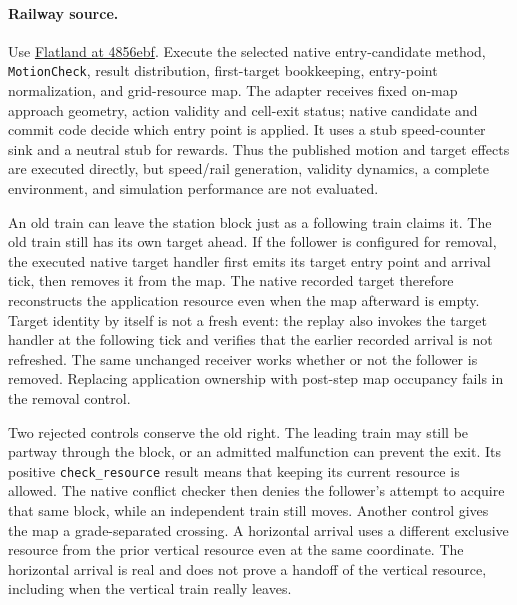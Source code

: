 \documentclass[11pt]{article}
\begin{document}
\paragraph{Railway source.}
Use \href{https://github.com/flatland-association/flatland-rl/tree/4856ebfe268d092d787d6b8536791a4fddb30772}{Flatland at 4856ebf}. Execute the selected native entry-candidate method, \texttt{MotionCheck}, result distribution, first-target bookkeeping, entry-point normalization, and grid-resource map. The adapter receives fixed on-map approach geometry, action validity and cell-exit status; native candidate and commit code decide which entry point is applied. It uses a stub speed-counter sink and a neutral stub for rewards. Thus the published motion and target effects are executed directly, but speed/rail generation, validity dynamics, a complete environment, and simulation performance are not evaluated.

An old train can leave the station block just as a following train claims it. The old train still has its own target ahead. If the follower is configured for removal, the executed native target handler first emits its target entry point and arrival tick, then removes it from the map. The native recorded target therefore reconstructs the application resource even when the map afterward is empty. Target identity by itself is not a fresh event: the replay also invokes the target handler at the following tick and verifies that the earlier recorded arrival is not refreshed. The same unchanged receiver works whether or not the follower is removed. Replacing application ownership with post-step map occupancy fails in the removal control.

Two rejected controls conserve the old right. The leading train may still be partway through the block, or an admitted malfunction can prevent the exit. Its positive \texttt{check\_resource} result means that keeping its current resource is allowed. The native conflict checker then denies the follower's attempt to acquire that same block, while an independent train still moves. Another control gives the map a grade-separated crossing. A horizontal arrival uses a different exclusive resource from the prior vertical resource even at the same coordinate. The horizontal arrival is real and does not prove a handoff of the vertical resource, including when the vertical train really leaves.
\end{document}
